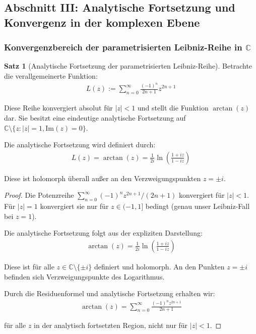 \documentclass[a4paper,12pt,twoside]{report}
\theoremstyle{definition}
\newtheorem{satz}{Satz}
\begin{document}
\subsection{Abschnitt III: Analytische Fortsetzung und Konvergenz in der komplexen Ebene}

\subsubsection{Konvergenzbereich der parametrisierten Leibniz-Reihe in $\mathbb{C}$}

\begin{satz}[Analytische Fortsetzung der parametrisierten Leibniz-Reihe]
Betrachte die verallgemeinerte Funktion:
\begin{align}
	L(z) := \sum_{n=0}^{\infty} \frac{(-1)^n}{2n+1} z^{2n+1}
	\label{eq:leibniz_general}
\end{align}

Diese Reihe konvergiert absolut für $|z| < 1$ und stellt die Funktion $\arctan(z)$ dar. Sie besitzt eine eindeutige analytische Fortsetzung auf $\mathbb{C} \setminus \{z : |z| = 1, \text{Im}(z) = 0\}$.

Die analytische Fortsetzung wird definiert durch:
\begin{align}
	L(z) = \arctan(z) = \frac{1}{2i} \ln\left(\frac{1+iz}{1-iz}\right)
	\label{eq:arctan_complex}
\end{align}

Diese ist holomorph überall außer an den Verzweigungspunkten $z = \pm i$.
\end{satz}

\begin{proof}
Die Potenzreihe $\sum_{n=0}^{\infty} (-1)^n z^{2n+1}/(2n+1)$ konvergiert für $|z| < 1$. Für $|z| = 1$ konvergiert sie nur für $z \in (-1, 1]$ bedingt (genau unser Leibniz-Fall bei $z = 1$).

Die analytische Fortsetzung folgt aus der expliziten Darstellung:
\begin{align}
	\arctan(z) = \frac{1}{2i} \ln\left(\frac{1+iz}{1-iz}\right)
\end{align}

Diese ist für alle $z \in \mathbb{C} \setminus \{\pm i\}$ definiert und holomorph. An den Punkten $z = \pm i$ befinden sich Verzweigungspunkte des Logarithmus.

Durch die Residuenformel und analytische Fortsetzung erhalten wir:
\begin{align}
	\arctan(z) = \sum_{n=0}^{\infty} \frac{(-1)^n z^{2n+1}}{2n+1}
\end{align}

für alle $z$ in der analytisch fortsetzten Region, nicht nur für $|z| < 1$.
\end{proof}
\end{document}
